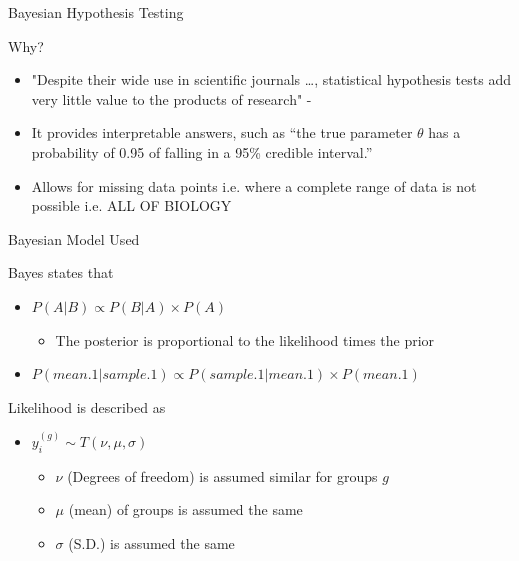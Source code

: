 \documentclass[t, aspectratio=169]{beamer}
\begin{document}
\begin{frame}[label={sec:orgef9cd50}]{Bayesian Hypothesis Testing}
\begin{block}{Why?}
\begin{itemize}[<+->]
\item "Despite their wide use in scientific journals \ldots{}, statistical  hypothesis tests add very little value to the products of research" - \citep{Johnson1999a}
\item It provides interpretable answers, such as “the true parameter \(\theta\) has a probability of 0.95 of falling in a 95\% credible interval.”
\item Allows for missing data points i.e. where a complete range of data is not possible i.e. ALL OF BIOLOGY
\end{itemize}
\end{block}
\end{frame}

\begin{frame}[label={sec:orga804b35}]{Bayesian Model Used}
\begin{block}{Bayes states that}
\begin{itemize}
\item \(P(A|B) \propto P(B|A) \times P(A)\)
\begin{itemize}
\item The posterior is proportional to the likelihood times the prior
\end{itemize}
\item \(P(mean.1 | sample.1) \propto P(sample.1 | mean.1) \times  P(mean.1)\)
\end{itemize}
\end{block}
\begin{block}{Likelihood is described as}
\begin{itemize}
\item \(y_i^{(g)} \sim T(\nu, \mu, \sigma)\)
\begin{itemize}
\item \(\nu\) (Degrees of freedom) is assumed similar for groups \(g\)
\item \(\mu\) (mean) of groups is assumed the same
\item \(\sigma\) (S.D.) is assumed the same
\end{itemize}
\end{itemize}
\end{block}
\end{frame}
\end{document}
